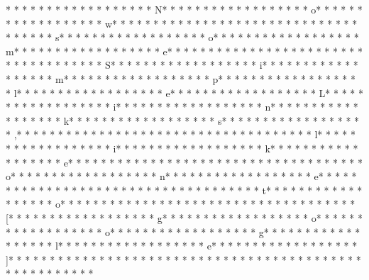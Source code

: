 * * *  * * *  * * *  *  * * *  *  * * *  * N* * *  * * *  * * *  *  * * *  *  * * *  * o* * *  * * *  * * *  *  * * *  *  * * *  * w* * *  * * *  * * *  *  * * *  *  * * *  *  * * *  * * *  * * *  *  * * *  *  * * *  * s* * *  * * *  * * *  *  * * *  *  * * *  * o* * *  * * *  * * *  *  * * *  *  * * *  * m* * *  * * *  * * *  *  * * *  *  * * *  * e* * *  * * *  * * *  *  * * *  *  * * *  *  * * *  * * *  * * *  *  * * *  *  * * *  * S* * *  * * *  * * *  *  * * *  *  * * *  * i* * *  * * *  * * *  *  * * *  *  * * *  * m* * *  * * *  * * *  *  * * *  *  * * *  * p* * *  * * *  * * *  *  * * *  *  * * *  * l* * *  * * *  * * *  *  * * *  *  * * *  * e* * *  * * *  * * *  *  * * *  *  * * *  * L* * *  * * *  * * *  *  * * *  *  * * *  * i* * *  * * *  * * *  *  * * *  *  * * *  * n* * *  * * *  * * *  *  * * *  *  * * *  * k* * *  * * *  * * *  *  * * *  *  * * *  * s* * *  * * *  * * *  *  * * *  *  * * *  * ,* * *  * * *  * * *  *  * * *  *  * * *  *  * * *  * * *  * * *  *  * * *  *  * * *  * l* * *  * * *  * * *  *  * * *  *  * * *  * i* * *  * * *  * * *  *  * * *  *  * * *  * k* * *  * * *  * * *  *  * * *  *  * * *  * e* * *  * * *  * * *  *  * * *  *  * * *  *  * * *  * * *  * * *  *  * * *  *  * * *  * o* * *  * * *  * * *  *  * * *  *  * * *  * n* * *  * * *  * * *  *  * * *  *  * * *  * e* * *  * * *  * * *  *  * * *  *  * * *  *  * * *  * * *  * * *  *  * * *  *  * * *  * t* * *  * * *  * * *  *  * * *  *  * * *  * o* * *  * * *  * * *  *  * * *  *  * * *  *  * * *  * * *  * * *  *  * * *  *  * * *  * [* * *  * * *  * * *  *  * * *  *  * * *  * g* * *  * * *  * * *  *  * * *  *  * * *  * o* * *  * * *  * * *  *  * * *  *  * * *  * o* * *  * * *  * * *  *  * * *  *  * * *  * g* * *  * * *  * * *  *  * * *  *  * * *  * l* * *  * * *  * * *  *  * * *  *  * * *  * e* * *  * * *  * * *  *  * * *  *  * * *  * ]* * *  * * *  * * *  *  * * *  *  * * *  *  * * *  * * *  * * *  *  * * *  *  * * *  * 
* * *  * * *  * * *  *  * * *  *  * * *  * 
